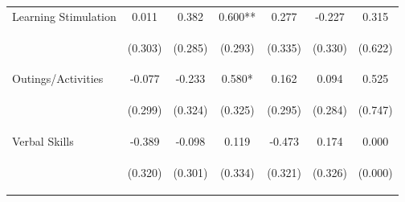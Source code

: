 \begin{tabular}{lcccccc}
\noalign{\smallskip}Learning Stimulation & 0.011 & 0.382 & 0.600** & 0.277 & -0.227 & 0.315\\
 & \begin{footnotesize}(0.303)\end{footnotesize} & \begin{footnotesize}(0.285)\end{footnotesize} & \begin{footnotesize}(0.293)\end{footnotesize} & \begin{footnotesize}(0.335)\end{footnotesize} & \begin{footnotesize}(0.330)\end{footnotesize} & \begin{footnotesize}(0.622)\end{footnotesize}\\
\noalign{\smallskip}Outings/Activities & -0.077 & -0.233 & 0.580* & 0.162 & 0.094 & 0.525\\
 & \begin{footnotesize}(0.299)\end{footnotesize} & \begin{footnotesize}(0.324)\end{footnotesize} & \begin{footnotesize}(0.325)\end{footnotesize} & \begin{footnotesize}(0.295)\end{footnotesize} & \begin{footnotesize}(0.284)\end{footnotesize} & \begin{footnotesize}(0.747)\end{footnotesize}\\
\noalign{\smallskip}Verbal Skills & -0.389 & -0.098 & 0.119 & -0.473 & 0.174 & 0.000\\
 & \begin{footnotesize}(0.320)\end{footnotesize} & \begin{footnotesize}(0.301)\end{footnotesize} & \begin{footnotesize}(0.334)\end{footnotesize} & \begin{footnotesize}(0.321)\end{footnotesize} & \begin{footnotesize}(0.326)\end{footnotesize} & \begin{footnotesize}(0.000)\end{footnotesize}\\

\end{tabular}
